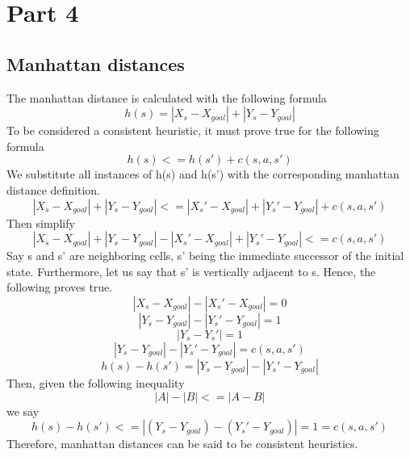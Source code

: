 \documentclass{article}
\begin{document}
\section{Part 4}
\subsection{Manhattan distances}
The manhattan distance is calculated with the following formula
\begin{equation}
	h(s) = |X_s - X_{goal}| + |Y_s - Y_{goal}|
\end{equation}
To be considered a consistent heuristic, it must prove true for the following formula
\begin{equation}
	h(s) <= h(s')+c(s,a,s')
\end{equation}
 We substitute all instances of h(s) and h(s') with the corresponding manhattan distance definition.
\begin{equation}
	|X_s - X_{goal}| + |Y_s - Y_{goal}| <= |X_s' - X_{goal}| + |Y_s' - Y_{goal}| + c(s,a,s')
\end{equation}
Then simplify
\begin{equation}
	|X_s - X_{goal}| + |Y_s - Y_{goal}| - |X_s' - X_{goal}| + |Y_s' - Y_{goal}| <= c(s,a,s')
\end{equation}
Say s and s' are neighboring cells, s' being the immediate successor of the initial state. Furthermore, let us say that s' is vertically adjacent to s. Hence, the following proves true.
\begin{equation}
	|X_s - X_{goal}| - |X_s' - X_{goal}| = 0	
\end{equation}
\begin{equation} 
	|Y_s - Y_{goal}| - |Y_s' - Y_{goal}| = 1
\end{equation}
\begin{equation} 
	|Y_s - Y_s'| = 1
\end{equation}
\begin{equation} 
	|Y_s - Y_{goal}| - |Y_s' - Y_{goal}| = c(s,a,s')
\end{equation}
\begin{equation} 
	h(s) - h(s') = |Y_s - Y_{goal}| - |Y_s' - Y_{goal}|
\end{equation}
Then, given the following inequality
\begin{equation}
	|A| - |B| <= |A-B|
\end{equation}
we say
\begin{equation}
	h(s) - h(s') <= |(Y_s - Y_{goal}) - (Y_s' - Y_{goal})|
		= 1
		= c(s,a,s')
\end{equation}
Therefore, manhattan distances can be said to be consistent heuristics.
\end{document}

